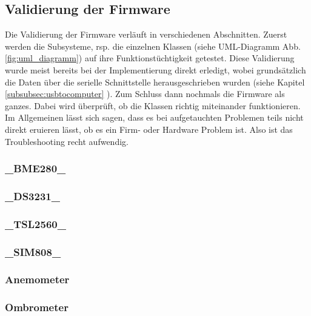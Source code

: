 \subsection{Validierung der Firmware}
\label{subsec:validierung_Firmware}
Die Validierung der Firmware verläuft in verschiedenen Abschnitten. Zuerst werden die Subsysteme, rsp. die einzelnen Klassen (siehe UML-Diagramm Abb. \ref{fig:uml_diagramm}) auf ihre Funktionstüchtigkeit getestet. Diese Validierung wurde meist bereits bei der Implementierung direkt erledigt, wobei grundsätzlich die Daten über die serielle Schnittstelle herausgeschrieben wurden (siehe Kapitel \ref{subsubsec:usbtocomputer} ). Zum Schluss dann nochmals die Firmware als ganzes. Dabei wird überprüft, ob die Klassen richtig miteinander funktionieren.\\

Im Allgemeinen lässt sich sagen, dass es bei aufgetauchten Problemen teils nicht direkt eruieren lässt, ob es ein Firm- oder Hardware Problem ist. Also ist das Troubleshooting recht aufwendig.\\


\subsubsection{\_BME280\_}
\label{subsubsec:val_BME280}

\subsubsection{\_DS3231\_}
\label{subsubsec:valDS3231}

\subsubsection{\_TSL2560\_}
\label{subsubsec:valTSL2560}

\subsubsection{\_SIM808\_}
\label{subsubsec:valSIM808}

\subsubsection{Anemometer}
\label{subsubsec:valAnemometer}

\subsubsection{Ombrometer}
\label{subsubsec:valOmbrometer}

